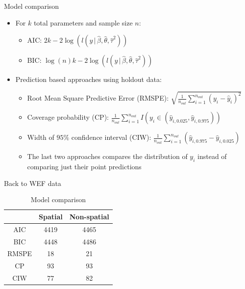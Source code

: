 \documentclass[xcolor=pdftex,dvipsnames,table,numbers,hyperref={pdfpagelabels=false},compress]{beamer}
\newcommand{\myitem}{\vskip3mm \item}
\newcommand{\given}{\,|\,}
\newcommand{\taus}{\tau^2}
\begin{document}
\begin{frame}{Model comparison}
	\begin{itemize}
		\item For $k$ total parameters and sample size $n$:
		\begin{itemize}
			\item \alert{AIC:} $2k - 2 \log (l(y \given \hat\beta, \hat\theta, \hat\taus))$
			\item \alert{BIC:} $\log(n) k - 2 \log (l(y \given \hat\beta, \hat\theta, \hat\taus))$
		\end{itemize}
		\myitem Prediction based approaches using holdout data:
		\begin{itemize}
			\item Root Mean Square Predictive Error (\alert{RMSPE}): $\sqrt{\frac 1{n_{out}}\sum_{i=1}^{n_{out}} (y_i - \hat y_i)^2}$
			\myitem Coverage probability (\alert{CP}): $\frac 1{n_{out}} \sum_{i=1}^{n_{out}} I(y_i \in (\hat y_{i,0.025}, \hat y_{i,0.975}))$
			\myitem Width of $95\%$ confidence interval (\alert{CIW}): $\frac 1{n_{out}} \sum_{i=1}^{n_{out}} (\hat y_{i,0.975}- \hat y_{i,0.025})$
			\myitem The last two approaches compares the distribution of $y_i$ instead of comparing just their point predictions
		\end{itemize}
	\end{itemize}
\end{frame}

\begin{frame}{Back to WEF data}
		\begin{table}
			\caption{Model comparison}
			\begin{tabular}{@{} ccc @{}}
				\toprule
				& Spatial & Non-spatial\\
				\midrule
				AIC & 4419 & 4465\\
				BIC & 4448 & 4486\\
				\midrule
				RMSPE & 18 & 21\\
				CP & 93 & 93\\
				CIW & 77 & 82\\
				\bottomrule
			\end{tabular}
		\end{table}
\end{frame}	
\end{document}
